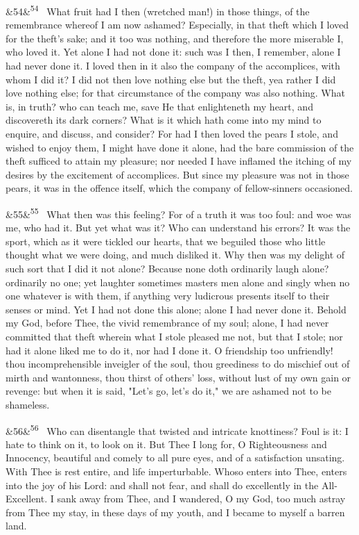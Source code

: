 \documentclass[12pt]{article}
\newcommand{\para}[1][]{\par\noindent\ifx&#1&\else\textsuperscript{\footnotesize #1}~\fi}
\begin{document}
\para[54] What fruit had I then (wretched man!) in those things, of the remembrance whereof I am now ashamed? Especially, in that theft which I loved for the theft's sake; and it too was nothing, and therefore the more miserable I, who loved it. Yet alone I had not done it: such was I then, I remember, alone I had never done it. I loved then in it also the company of the accomplices, with whom I did it? I did not then love nothing else but the theft, yea rather I did love nothing else; for that circumstance of the company was also nothing. What is, in truth? who can teach me, save He that enlighteneth my heart, and discovereth its dark corners? What is it which hath come into my mind to enquire, and discuss, and consider? For had I then loved the pears I stole, and wished to enjoy them, I might have done it alone, had the bare commission of the theft sufficed to attain my pleasure; nor needed I have inflamed the itching of my desires by the excitement of accomplices. But since my pleasure was not in those pears, it was in the offence itself, which the company of fellow-sinners occasioned.

\para[55] What then was this feeling? For of a truth it was too foul: and woe was me, who had it. But yet what was it? Who can understand his errors? It was the sport, which as it were tickled our hearts, that we beguiled those who little thought what we were doing, and much disliked it. Why then was my delight of such sort that I did it not alone? Because none doth ordinarily laugh alone? ordinarily no one; yet laughter sometimes masters men alone and singly when no one whatever is with them, if anything very ludicrous presents itself to their senses or mind. Yet I had not done this alone; alone I had never done it. Behold my God, before Thee, the vivid remembrance of my soul; alone, I had never committed that theft wherein what I stole pleased me not, but that I stole; nor had it alone liked me to do it, nor had I done it. O friendship too unfriendly! thou incomprehensible inveigler of the soul, thou greediness to do mischief out of mirth and wantonness, thou thirst of others' loss, without lust of my own gain or revenge: but when it is said, "Let's go, let's do it," we are ashamed not to be shameless.

\para[56] Who can disentangle that twisted and intricate knottiness? Foul is it: I hate to think on it, to look on it. But Thee I long for, O Righteousness and Innocency, beautiful and comely to all pure eyes, and of a satisfaction unsating. With Thee is rest entire, and life imperturbable. Whoso enters into Thee, enters into the joy of his Lord: and shall not fear, and shall do excellently in the All-Excellent. I sank away from Thee, and I wandered, O my God, too much astray from Thee my stay, in these days of my youth, and I became to myself a barren land.
\end{document}
